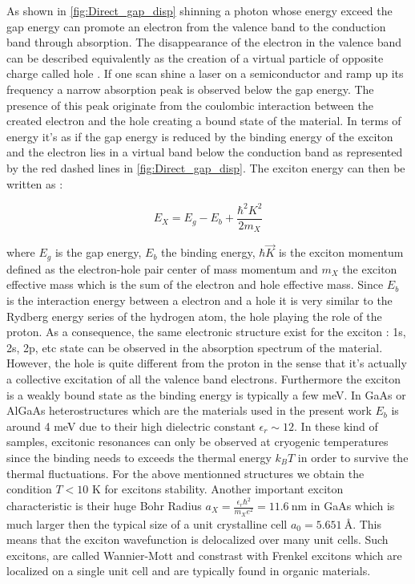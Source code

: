 As shown in \autoref{fig:Direct_gap_disp} shinning a photon whose energy exceed the gap energy can promote an electron from the valence band to the conduction band through absorption. 
The disappearance of the electron in the valence band can be described equivalently as the creation of a virtual particle of opposite charge called hole \cite{Combescot_cooper_excitons_2015}.
 If one scan shine a laser on a semiconductor and ramp up its frequency a narrow absorption peak is observed below the gap energy.  The presence of this peak originate from the coulombic interaction between the created electron and the hole creating a bound state of the material. In terms of energy it's as if the gap energy is reduced by the binding energy of the exciton and the electron lies in a virtual band below the conduction band as represented by the red dashed lines in \autoref{fig:Direct_gap_disp}.
 The exciton energy can then be written as : 

\begin{equation}
    E_{X} = E_g - E_b + \frac{\hbar^2 K^2}{2m_{X}}
\end{equation}

where $E_g$ is the gap energy, $E_b$ the binding energy,  $\hbar \vec{K}$ is the exciton momentum defined as the electron-hole pair center of mass momentum and $m_{X}$ the exciton effective mass which is the sum of the electron and hole effective mass.
Since $E_b$ is the interaction energy between a electron and a hole it is very similar to the Rydberg energy series of the hydrogen atom, the hole playing the role of the proton. As a consequence, the same electronic structure exist for the exciton : 1s, 2s, 2p, etc state can be observed in the absorption spectrum of the material.
However, the hole is quite different from the proton in the sense that it's actually a collective excitation of all the valence band electrons. Furthermore the exciton is a weakly bound state as the binding energy is typically a few meV. In GaAs or AlGaAs heterostructures which are the materials used in the present work $E_b$ is around 4 meV due to their high dielectric constant $\epsilon_r \sim 12$.
In these kind of samples, excitonic resonances can only be observed at cryogenic temperatures since the binding needs to exceeds the thermal energy $k_B T$ in order to survive the thermal fluctuations. For the above mentionned structures we obtain the condition $T<10$ K for excitons stability.
Another important exciton characteristic is their huge Bohr Radius $a_X= \frac{\epsilon_r \hbar^2}{m_X e^2}= 11.6 \ \mathrm{nm}$ in GaAs which  is much larger then the typical size of a unit crystalline cell $a_0 = 5.65 \SI{1}{\angstrom}$. This means that the exciton wavefunction is delocalized over many unit cells. Such excitons, are called Wannier-Mott and constrast with Frenkel excitons which are localized on a single unit cell and are typically found in organic materials.
 \bigskip\noindent

